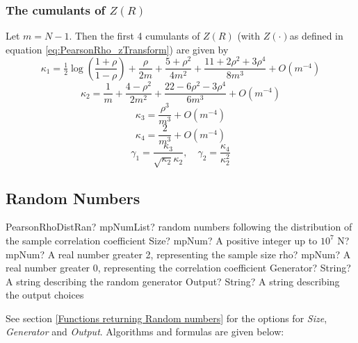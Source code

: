 \subsubsection{The cumulants of $Z(R)$}
Let $m = N - 1$. Then the first 4 cumulants of $Z(R)$ (with $Z(\cdot)$as defined in equation \ref{eq:PearsonRho_zTransform}) are given by \citep{hotelling_1953}
\begin{equation} \label{eq:PearsonRho_kappa1}
	\kappa_1= \tfrac{1}{2} \log \left(\frac{1+\rho}{1-\rho}\right) + \frac{\rho}{2m} + \frac{5+\rho^2}{4m^2} + \frac{11+2\rho^2+3\rho^4}{8m^3} + O(m^{-4})
\end{equation}
\begin{equation}
	\kappa_2=\frac{1}{m} + \frac{4-\rho^2}{2m^2} + \frac{22-6\rho^2-3\rho^4}{6m^3} + O(m^{-4})
\end{equation}
\begin{equation}
	\kappa_3=\frac{\rho^3}{m^3} + O(m^{-4})
\end{equation}
\begin{equation}
	\kappa_4=\frac{2}{m^3} + O(m^{-4})
\end{equation}
\begin{equation}  \label{eq:PearsonRho_gamma1}
	\gamma_1=\frac{\kappa_3}{\sqrt{\kappa_2}\kappa_2}, \quad \gamma_2=\frac{\kappa_4}{\kappa_2^2} 
\end{equation}



\subsection{Random Numbers}
\label{PearsonRhoDistributionRandom}

\begin{mpFunctionsExtract}
	\mpFunctionFiveNotImplemented
	{PearsonRhoDistRan? mpNumList? random numbers following the distribution of the sample correlation coefficient}
	{Size? mpNum? A positive integer up to $10^7$}
	{N? mpNum? A real number greater 2, representing the sample size}
	{rho? mpNum? A real number greater 0, representing the correlation coefficient}
	{Generator? String? A string describing the random generator}
	{Output? String? A string describing the output choices}
\end{mpFunctionsExtract}


\vspace{0.3cm}
See section \ref{Functions returning Random numbers} for the options for  {\itshape\sffamily Size},  {\itshape\sffamily Generator} and {\itshape\sffamily Output}. Algorithms and formulas are given below:


